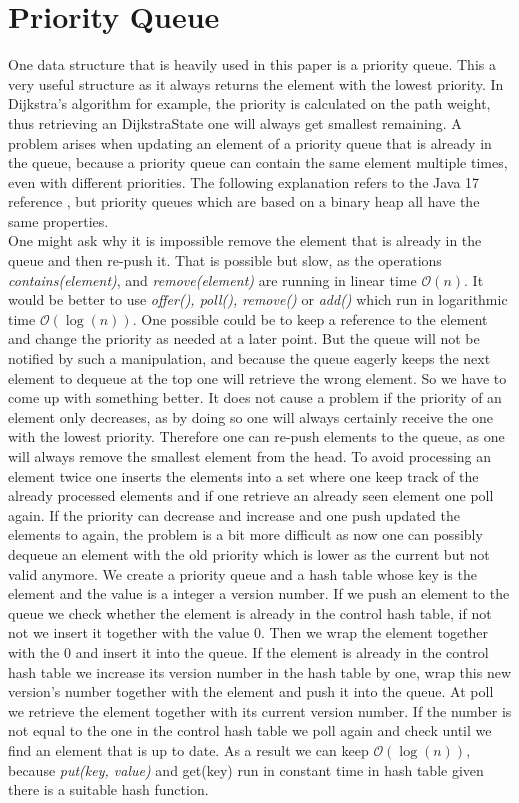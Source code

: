 \section{Priority Queue}

One data structure that is heavily used in this paper is a priority queue.
This a very useful structure as it always returns the element with the lowest priority.
In Dijkstra's algorithm for example, the priority is calculated on the path weight, thus retrieving an DijkstraState one will always get smallest remaining.
A problem arises when updating an element of a priority queue that is already in the queue, because a priority queue can contain the same element multiple times, even with different priorities.
The following explanation refers to the Java 17 reference \cite{JavaPrioQueue}, but priority queues which are based on a binary heap \cite{floyd1964algorithm} all have the same properties.
\\
One might ask why it is impossible remove the element that is already in the queue and then re-push it.
That is possible but slow, as the operations \textit{contains(element)}, and \textit{remove(element)} are running in linear time $\mathcal{O}(n) $.
It would be better to use \textit{offer(), poll(), remove()} or \textit{add()} which run in logarithmic time $\mathcal{O}( \log (n))$.
One possible could be to keep a reference to the element and change the priority as needed at a later point.
But the queue will not be notified by such a manipulation, and because the queue eagerly keeps the next element to dequeue at the top one will retrieve the wrong element.
So we have to come up with something better.
It does not cause a problem if the priority of an element only decreases, as by doing so one will always certainly receive the one with the lowest priority.
Therefore one can re-push elements to the queue, as one will always remove the smallest element from the head.
To avoid processing an element twice one inserts the elements into a set where one keep track of the already processed elements and if one retrieve an already seen element one poll again.
If the priority can decrease and increase and one push updated the elements to again, the problem is a bit more difficult as now one can possibly dequeue an element with the old priority which is lower as the current but not valid anymore.
We create a priority queue and a hash table whose key is the element and the value is a integer a version number.
If we push an element to the queue we check whether the element is already in the control hash table, if not not we insert it together with the value $0$.
Then we wrap the element together with the $0$ and insert it into the queue.
If the element is already in the control hash table we increase its version number in the hash table by one, wrap this new version's number together with the element and push it into the queue.
At poll we retrieve the element together with its current version number.
If the number is not equal to the one in the control hash table we poll again and check until we find an element that is up to date. 
As a result we can keep $\mathcal{O}( \log (n))$, because \textit{put(key, value)} and {get(key)} run in constant time in hash table given there is a suitable hash function.

